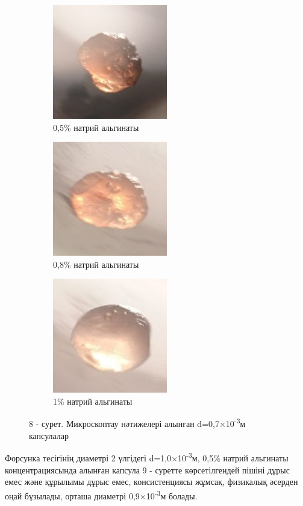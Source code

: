 \begin{figure}[H]
	\centering
	\begin{subfigure}[b]{0.3\textwidth}
		\centering
		\includegraphics[width=5cm,height=5cm]{media/pish/image35}
		\caption*{0,5\% натрий альгинаты}
	\end{subfigure}
	\hfill
	\begin{subfigure}[b]{0.3\textwidth}
		\centering
		\includegraphics[width=5cm,height=5cm]{media/pish/image36}
		\caption*{0,8\% натрий альгинаты}
	\end{subfigure}
	\hfill
	\begin{subfigure}[b]{0.3\textwidth}
		\centering
		\includegraphics[width=5cm,height=5cm]{media/pish/image37}
		\caption*{1\% натрий альгинаты}
	\end{subfigure}
	\caption*{8 - сурет. Микроскоптау нәтижелері алынған d=0,7×10\textsuperscript{-3}м капсулалар}
\end{figure}

Форсунка тесігінің диаметрі 2 үлгідегі d=1,0×10\textsuperscript{-3}м,
0,5\% натрий альгинаты концентрациясында алынған капсула 9 - суретте
көрсетілгендей пішіні дұрыс емес және құрылымы дұрыс емес,
консистенциясы жұмсақ, физикалық әсерден оңай бұзылады, орташа диаметрі
0,9×10\textsuperscript{-3}м болады.


